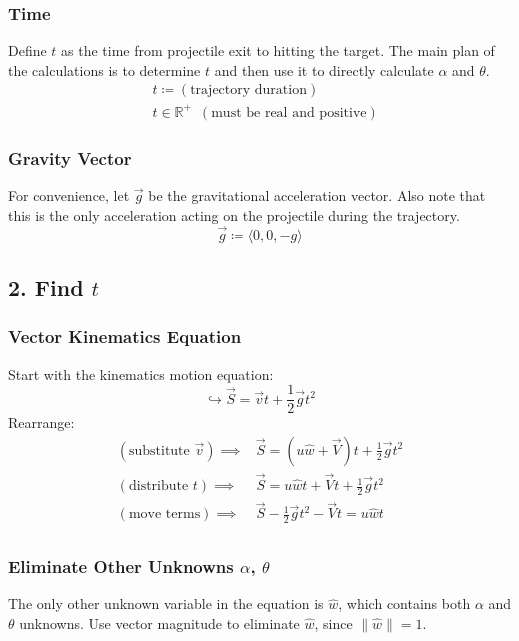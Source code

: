 \documentclass{article}
\begin{document}
\subsubsection*{Time}
Define $t$ as the time from projectile exit to hitting the target. The main plan of the calculations is to determine $t$ and then use it to directly calculate $\alpha$ and $\theta$.
\begin{align*}
    &t\coloneqq(\text{trajectory duration}) \\
    &t\in\mathbb{R}^+\enspace(\text{must be real and positive})
\end{align*}

\subsubsection*{Gravity Vector}
For convenience, let $\vec{g}$ be the gravitational acceleration vector. Also note that this is the only acceleration acting on the projectile during the trajectory.
\[ \vec{g}\coloneqq\langle0,0,-g\rangle \]

\subsection*{2. Find $t$}

\subsubsection*{Vector Kinematics Equation}
Start with the kinematics motion equation:
\[ \hookrightarrow\vec{S}=\vec{v}t+\frac{1}{2}\vec{g}t^2 \]
Rearrange:
\begin{align*}
    (\text{substitute }\vec{v})\implies&\vec{S}=(u\hat{w}+\vec{V})t+\frac{1}{2}\vec{g}t^2 \\
    (\text{distribute }t)\implies&\vec{S}=u\hat{w}t+\vec{V}t+\frac{1}{2}\vec{g}t^2 \\
    (\text{move terms})\implies&\vec{S}-\frac{1}{2}\vec{g}t^2-\vec{V}t=u\hat{w}t \\
\end{align*}

\subsubsection*{Eliminate Other Unknowns $\alpha$, $\theta$}
The only other unknown variable in the equation is $\hat{w}$, which contains both $\alpha$ and $\theta$ unknowns. Use vector magnitude to eliminate $\hat{w}$, since $\lVert\hat{w}\rVert=1$.
\end{document}
